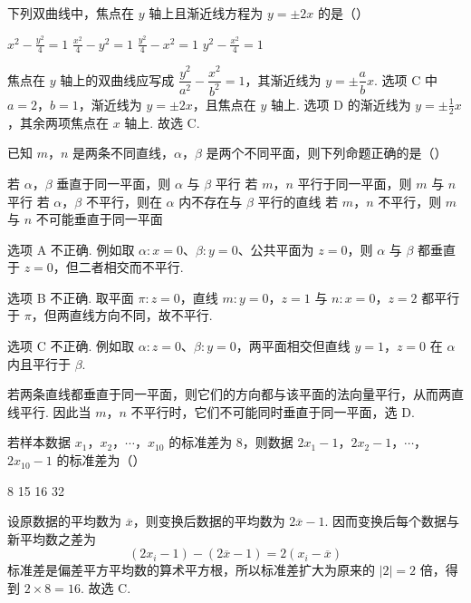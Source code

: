 \begin{problem}
下列双曲线中，焦点在 \(y\) 轴上且渐近线方程为 \(y = \pm 2x\) 的是（\quad）

\choices
    {\(x^{2} - \frac{y^{2}}{4} = 1\)}
    {\(\frac{x^2}{4} - y^2 = 1\)}
    {\(\frac{y^2}{4} - x^2 = 1\)}
    {\( y^{2}-\frac{x^{2}}{4}=1 \)}

\begin{solution}
焦点在 \(y\) 轴上的双曲线应写成
\(\dfrac{y^2}{a^2}-\dfrac{x^2}{b^2}=1\)，其渐近线为 \(y=\pm\dfrac{a}{b}x\). 选项 C 中 \(a=2\)，\(b=1\)，渐近线为 \(y=\pm2x\)，且焦点在 \(y\) 轴上. 选项 D 的渐近线为 \(y=\pm\frac12x\)，其余两项焦点在 \(x\) 轴上. 故选 C.
\end{solution}
\end{problem}

\begin{problem}
已知 \(m\)，\(n\) 是两条不同直线，\(\alpha\)，\(\beta\) 是两个不同平面，则下列命题正确的是（\quad）

\choices
    {若 \(\alpha\)，\(\beta\) 垂直于同一平面，则 \(\alpha\) 与 \(\beta\) 平行}
    {若 \(m\)，\(n\) 平行于同一平面，则 \(m\) 与 \(n\) 平行}
    {若 \(\alpha\)，\(\beta\) 不平行，则在 \(\alpha\) 内不存在与 \(\beta\) 平行的直线}
    {若 \(m\)，\(n\) 不平行，则 \(m\) 与 \(n\) 不可能垂直于同一平面}

\begin{solution}
选项 A 不正确. 例如取 \(\alpha:x=0\)、\(\beta:y=0\)、公共平面为 \(z=0\)，则 \(\alpha\) 与 \(\beta\) 都垂直于 \(z=0\)，但二者相交而不平行.

选项 B 不正确. 取平面 \(\pi:z=0\)，直线 \(m:y=0\)，\(z=1\) 与 \(n:x=0\)，\(z=2\) 都平行于 \(\pi\)，但两直线方向不同，故不平行.

选项 C 不正确. 例如取 \(\alpha:z=0\)、\(\beta:y=0\)，两平面相交但直线 \(y=1\)，\(z=0\) 在 \(\alpha\) 内且平行于 \(\beta\).

若两条直线都垂直于同一平面，则它们的方向都与该平面的法向量平行，从而两直线平行. 因此当 \(m\)，\(n\) 不平行时，它们不可能同时垂直于同一平面，选 D.
\end{solution}
\end{problem}

\begin{problem}
若样本数据 \(x_{1}\)，\(x_{2}\)，\(\cdots\)，\(x_{10}\) 的标准差为 8，则数据 \(2x_{1}-1\)，\(2x_{2}-1\)，\(\cdots\)，\(2x_{10}-1\) 的标准差为（\quad）

\choices
    {8}
    {15}
    {16}
    {32}

\begin{solution}
设原数据的平均数为 \(\overline{x}\)，则变换后数据的平均数为 \(2\overline{x}-1\). 因而变换后每个数据与新平均数之差为
\[
(2x_i-1)-(2\overline{x}-1)=2(x_i-\overline{x})
\]
标准差是偏差平方平均数的算术平方根，所以标准差扩大为原来的 \(|2|=2\) 倍，得到 \(2\times8=16\). 故选 C.
\end{solution}
\end{problem}

